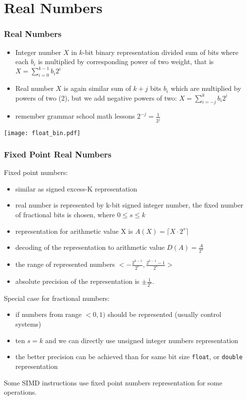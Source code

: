 \documentclass{beamer}
\begin{document}
\section{Real Numbers}


\begin{frame}
\frametitle{Real Numbers}

\begin{itemize}
\item Integer number $X$ in $k$-bit binary representation divided sum of bits where each $b_i$ is multiplied by corresponding power of two weight, that is $ X = \sum_{i=0}^{k-1} b_i 2^{i} $
\item Real number $X$ is again similar sum of $k+j$ bits $b_i$ which are multiplied by powers of two (2), but we add negative powers of two: $X = \sum_{i=-j}^{k} b_i 2^{i}$
\item remember grammar school math lessons $2^{-j} = \frac{1}{2^j}$
\end{itemize}


\begin{center}
\texttt{[image: float\_bin.pdf]}
\end{center}

\end{frame}


\begin{frame}
\frametitle{Fixed Point Real Numbers}

Fixed point numbers:

\begin{itemize}
\item similar as signed excess-K representation
\item real number is represented by k-bit signed integer number, the fixed number of fractional bits is chosen, where $0 \le s \le k$
\item representation for arithmetic value X is $A(X) = \lceil X \cdot 2^s \rceil$
\item decoding of the representation to arithmetic value $D(A) = \frac{A}{2^s}$
\item the range of represented numbers $<-\frac{2^{k-1}}{2^s}, \frac{2^{k-1}-1}{2^s}>$
\item absolute precision of the representation is $\pm \frac{1}{2^s}$.
\end{itemize}

 Special case for fractional numbers:
\begin{itemize}
\item if numbers from range $<0,1)$ should be represented (usually control systems)
\item ten $s=k$ and we can directly use unsigned integer numbers representation
\item the better precision can be achieved than for same bit size \texttt{float}, or \texttt{double} representation
\end{itemize}

Some SIMD instructions use fixed point numbers representation for some operations.

\end{frame}
\end{document}
